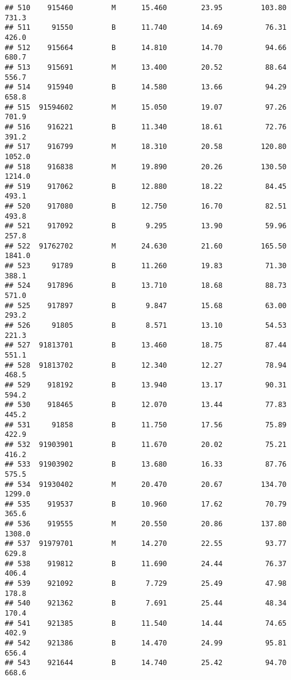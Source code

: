 \documentclass[
]{article}
\begin{document}
\begin{verbatim}
## 510    915460         M      15.460        23.95         103.80     731.3
## 511     91550         B      11.740        14.69          76.31     426.0
## 512    915664         B      14.810        14.70          94.66     680.7
## 513    915691         M      13.400        20.52          88.64     556.7
## 514    915940         B      14.580        13.66          94.29     658.8
## 515  91594602         M      15.050        19.07          97.26     701.9
## 516    916221         B      11.340        18.61          72.76     391.2
## 517    916799         M      18.310        20.58         120.80    1052.0
## 518    916838         M      19.890        20.26         130.50    1214.0
## 519    917062         B      12.880        18.22          84.45     493.1
## 520    917080         B      12.750        16.70          82.51     493.8
## 521    917092         B       9.295        13.90          59.96     257.8
## 522  91762702         M      24.630        21.60         165.50    1841.0
## 523     91789         B      11.260        19.83          71.30     388.1
## 524    917896         B      13.710        18.68          88.73     571.0
## 525    917897         B       9.847        15.68          63.00     293.2
## 526     91805         B       8.571        13.10          54.53     221.3
## 527  91813701         B      13.460        18.75          87.44     551.1
## 528  91813702         B      12.340        12.27          78.94     468.5
## 529    918192         B      13.940        13.17          90.31     594.2
## 530    918465         B      12.070        13.44          77.83     445.2
## 531     91858         B      11.750        17.56          75.89     422.9
## 532  91903901         B      11.670        20.02          75.21     416.2
## 533  91903902         B      13.680        16.33          87.76     575.5
## 534  91930402         M      20.470        20.67         134.70    1299.0
## 535    919537         B      10.960        17.62          70.79     365.6
## 536    919555         M      20.550        20.86         137.80    1308.0
## 537  91979701         M      14.270        22.55          93.77     629.8
## 538    919812         B      11.690        24.44          76.37     406.4
## 539    921092         B       7.729        25.49          47.98     178.8
## 540    921362         B       7.691        25.44          48.34     170.4
## 541    921385         B      11.540        14.44          74.65     402.9
## 542    921386         B      14.470        24.99          95.81     656.4
## 543    921644         B      14.740        25.42          94.70     668.6

\end{verbatim}
\end{document}
